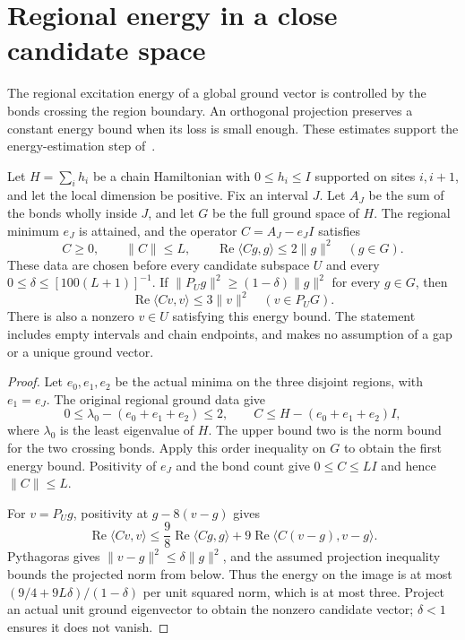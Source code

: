 \section{Regional energy in a close candidate space}

The regional excitation energy of a global ground vector is controlled
by the bonds crossing the region boundary. An orthogonal projection
preserves a constant energy bound when its loss is small enough. These
estimates support the energy-estimation step of~\cite{Arad2016RigorousRG}.

\begin{lemma}
    \label{lem:regional_ground_energy_bound}
    \leanok
    Let $H=\sum_i h_i$ be a chain Hamiltonian with $0\le h_i\le I$
    supported on sites $i,i+1$, and let the local dimension be positive.
    Fix an interval $J$. Let $A_J$ be the sum of the bonds wholly inside
    $J$, and let $G$ be the full ground space of $H$. The regional minimum
    $e_J$ is attained, and the operator $C=A_J-e_JI$ satisfies
    \[
        C\ge0,\qquad \|C\|\le L,\qquad
        \operatorname{Re}\langle Cg,g\rangle\le2\|g\|^2
        \quad(g\in G).
    \]
    These data are chosen before every candidate subspace $U$ and every
    $0\le\delta\le[100(L+1)]^{-1}$. If
    $\|P_Ug\|^2\ge(1-\delta)\|g\|^2$ for every $g\in G$, then
    \[
        \operatorname{Re}\langle Cv,v\rangle\le3\|v\|^2
        \quad(v\in P_U G).
    \]
    There is also a nonzero $v\in U$ satisfying this energy bound.
    The statement includes empty intervals and chain endpoints, and
    makes no assumption of a gap or a unique ground vector.
\end{lemma}
\begin{proof}\leanok
    Let $e_0,e_1,e_2$ be the actual minima on the three disjoint regions,
    with $e_1=e_J$. The original regional ground data give
    \[
        0\le\lambda_0-(e_0+e_1+e_2)\le2,
        \qquad C\le H-(e_0+e_1+e_2)I,
    \]
    where $\lambda_0$ is the least eigenvalue of $H$. The upper bound
    two is the norm bound for the two crossing bonds. Apply this order
    inequality on $G$ to obtain the first energy bound. Positivity of
    $e_J$ and the bond count give $0\le C\le LI$ and hence $\|C\|\le L$.

    For $v=P_Ug$, positivity at $g-8(v-g)$ gives
    \[
        \operatorname{Re}\langle Cv,v\rangle
        \le\frac98\operatorname{Re}\langle Cg,g\rangle
        +9\operatorname{Re}\langle C(v-g),v-g\rangle.
    \]
    Pythagoras gives $\|v-g\|^2\le\delta\|g\|^2$, and the assumed
    projection inequality bounds the projected norm from below. Thus
    the energy on the image is at most
    $(9/4+9L\delta)/(1-\delta)$ per unit squared norm, which is at
    most three. Project an actual unit ground eigenvector to obtain
    the nonzero candidate vector; $\delta<1$ ensures it does not vanish.
\end{proof}

